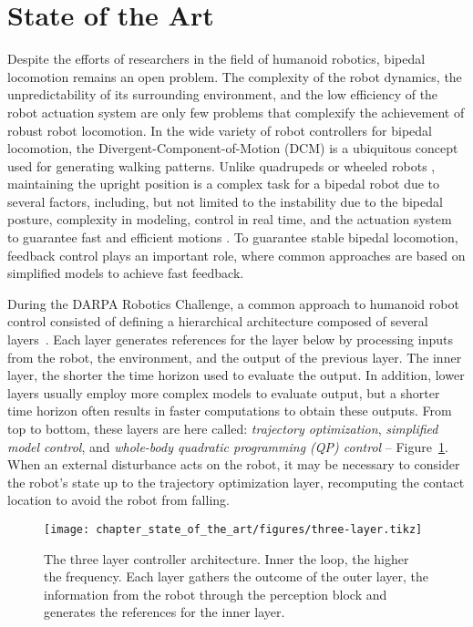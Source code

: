 \section{State of the Art \label{sec:soa}}
Despite the efforts of researchers in the field of humanoid robotics, bipedal locomotion remains an open problem. The complexity of the robot dynamics, the unpredictability of its surrounding environment, and the low efficiency of the robot actuation system are only few problems that complexify the achievement of robust robot locomotion. In the wide variety of robot controllers for bipedal locomotion, the Divergent-Component-of-Motion (DCM) is a ubiquitous concept used for generating walking patterns. Unlike quadrupeds \citep{Poulakakis2005} or wheeled robots \citep{Borst2009}, maintaining the upright position is a complex task for a bipedal robot due to several factors, including, but not limited to the instability due to the bipedal posture, complexity in modeling, control in real time, and the actuation system to guarantee fast and efficient motions \citep{Kaneko2011, Tsagarakis2017}.
To guarantee stable bipedal locomotion, feedback control plays an important role, where common approaches are based on simplified models to achieve fast feedback.
\par
During the DARPA Robotics Challenge, a common approach to humanoid robot control consisted of defining a hierarchical architecture composed of several layers~\citep{feng2015optimization}. Each layer generates references for the layer below by processing inputs from the robot, the environment, and the output of the previous layer.
The inner layer, the shorter the time horizon used to evaluate the output. In addition, lower layers usually employ more complex models to evaluate output, but a shorter time horizon often results in faster computations to obtain these outputs. From top to bottom, these layers are here called:
\emph{trajectory optimization}, \emph{simplified model control}, and \emph{whole-body quadratic programming (QP) control} -- Figure~\ref{fig:three-layer}.  When an external disturbance acts on the robot, it may be necessary to consider the robot's state up to the trajectory optimization layer, recomputing the contact location to avoid the robot from falling.

\begin{figure}[t]
    \centering
    \texttt{[image: chapter\_state\_of\_the\_art/figures/three-layer.tikz]}
    \caption[The three layer controller architecture]{The three layer controller architecture. Inner the loop, the higher the frequency. Each layer gathers the outcome of the outer layer, the information from the robot through the perception block and generates the references for the inner layer.}
    \label{fig:three-layer}
\end{figure}

